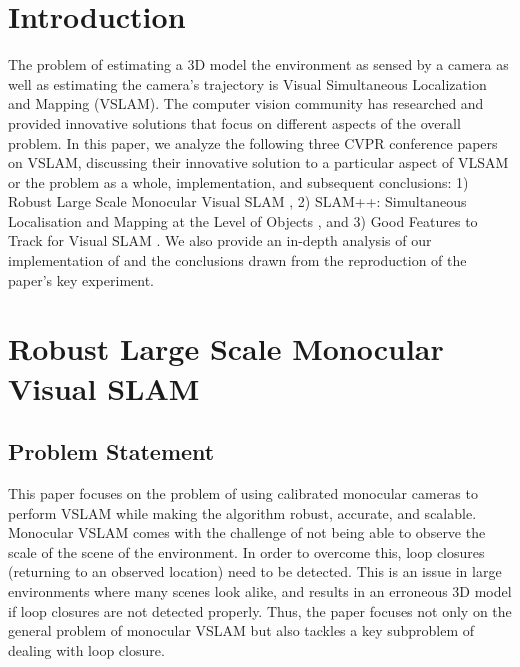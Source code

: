 \documentclass[10pt,twocolumn,letterpaper]{article}
\begin{document}
\section{Introduction}
The problem of estimating a 3D model the environment as sensed by a camera as well as estimating the 
camera's trajectory is Visual Simultaneous Localization and Mapping (VSLAM). The computer vision community has researched 
and provided innovative solutions that focus on different aspects of the overall problem. In this paper, we analyze the following three CVPR conference papers on VSLAM, discussing their innovative solution to a particular aspect of VLSAM or the problem as a whole, implementation, and subsequent conclusions: 
1) Robust Large Scale Monocular Visual SLAM \cite{Bourmaud_2015_CVPR}, 
2) SLAM++: Simultaneous Localisation and Mapping at the Level of Objects \cite{Salas-Moreno_2013_CVPR}, and 
3) Good Features to Track for Visual SLAM \cite{Zhang_2015_CVPR}. We also provide an in-depth analysis of our implementation of \cite{Zhang_2015_CVPR} and the conclusions drawn from the reproduction of the paper's key experiment.

\section{Robust Large Scale Monocular Visual SLAM}

\subsection{Problem Statement}
This paper focuses on the problem of using calibrated monocular cameras to perform VSLAM 
while making the 
algorithm robust, accurate, and scalable. Monocular VSLAM comes with the challenge of not being able to 
observe the scale of the scene of the environment. In order to overcome this, loop closures (returning to an observed location) need to be
 detected. This is an issue in large environments where many scenes look alike, and results in an erroneous 
3D model if loop closures are not detected properly. Thus, the paper focuses not only on the general 
problem of monocular VSLAM but also tackles 
a key subproblem of dealing with loop closure.

\end{document}
